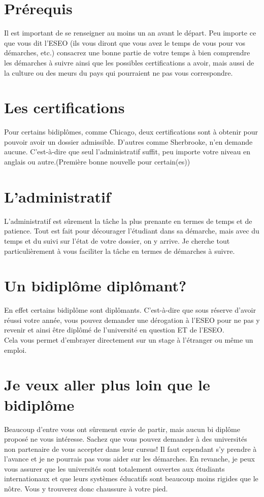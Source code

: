 \section{Prérequis}\label{sec:sec1}

Il est important de se renseigner au moins un an avant le départ. Peu importe ce que vous dit l'ESEO (ils vous diront que vous avez le temps de vous pour vos démarches, etc.) consacrez une bonne partie de votre temps à bien comprendre les démarches à suivre ainsi que les possibles certifications a avoir, mais aussi de la culture ou des meurs du pays qui pourraient ne pas vous correspondre.

\section{Les certifications}\label{sec:sec2}

Pour certains bidiplômes, comme Chicago, deux certifications sont à obtenir pour pouvoir avoir un dossier admissible. D'autres comme Sherbrooke, n'en demande aucune. C'est-à-dire que seul l'administratif suffit, peu importe votre niveau en anglais ou autre.(Première bonne nouvelle pour certain(es))

\section{L'administratif}\label{sec:sec3}

L'administratif est sûrement la tâche la plus prenante en termes de temps et de patience. Tout est fait pour décourager l'étudiant dans sa démarche, mais avec du temps et du suivi sur l'état de votre dossier, on y arrive. Je cherche tout particulièrement à vous faciliter la tâche en termes de démarches à suivre.

\section{Un bidiplôme diplômant?}\label{sec:sec4}

En effet certains bidiplôme sont diplômants. C'est-à-dire que sous réserve d'avoir réussi votre année, vous pouvez demander une dérogation à l'ESEO pour ne pas y revenir et ainsi être diplômé de l'université en question ET de l'ESEO. \\
Cela vous permet d'embrayer directement sur un stage à l'étranger ou même un emploi.

\section{Je veux aller plus loin que le bidiplôme}\label{sec:sec5}

Beaucoup d'entre vous ont sûrement envie de partir, mais aucun bi diplôme proposé ne vous intéresse. Sachez que vous pouvez demander à des universités non partenaire de vous accepter dans leur cursus! Il faut cependant s'y prendre à l'avance et je ne pourrais pas vous aider sur les démarches. En revanche, je peux vous assurer que les universités sont totalement ouvertes aux étudiants internationaux et que leurs systèmes éducatifs sont beaucoup moins rigides que le nôtre. Vous y trouverez donc chaussure à votre pied.
